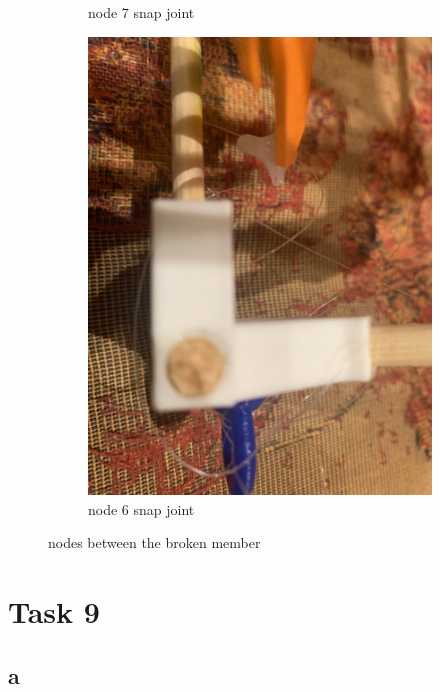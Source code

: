 \documentclass{report}
\newcommand{\subimgw}{.7\linewidth}
\begin{document}
\begin{figure}[H]
\begin{subfigure}{.5\textwidth}
		\caption{node 7 snap joint}
		\label{fig:snap:7}
	\end{subfigure}%
	\begin{subfigure}{.5\textwidth}
		\centering
		\includegraphics[width=\subimgw,trim={0 5cm 0 40cm},clip]{beam-7}

		\caption{node 6 snap joint}
		\label{fig:snap:6}
	\end{subfigure}

	\caption{nodes between the broken member}
	\label{fig:snap}
\end{figure}

\section{Task 9}

\subsection{a}
\end{document}
